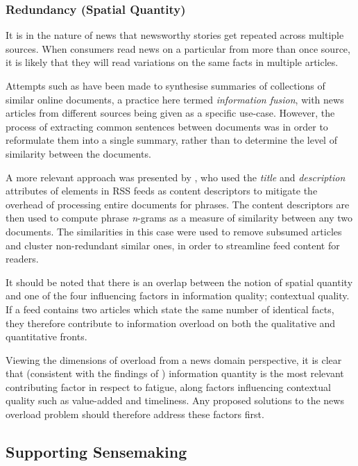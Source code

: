 \subsubsection{Redundancy (Spatial Quantity)}
It is in the nature of news that newsworthy stories get repeated across multiple sources. When consumers read news on a particular from more than once source, it is likely that they will read variations on the same facts in multiple articles.

Attempts such as \citep{InformationFusionInTheContextOfMultiDocumentSummarization} have been made to synthesise summaries of collections of similar online documents, a practice here termed \textit{information fusion}, with news articles from different sources being given as a specific use-case. However, the process of extracting common sentences between documents was in order to reformulate them into a single summary, rather than to determine the level of similarity between the documents.

A more relevant approach was presented by \cite{UtilizingPhraseSimilarityMeasures}, who used the \textit{title} and \textit{description} attributes of elements in RSS feeds as content descriptors to mitigate the overhead of processing entire documents for phrases. The content descriptors are then used to compute phrase \textit{n}-grams as a measure of similarity between any two documents. The similarities in this case were used to remove subsumed articles and cluster non-redundant similar ones, in order to streamline feed content for readers.

It should be noted that there is an overlap between the notion of spatial quantity and one of the four influencing factors in information quality; contextual quality. If a feed contains two articles which state the same number of identical facts, they therefore contribute to information overload on both the qualitative and quantitative fronts.

Viewing the dimensions of overload from a news domain perspective, it is clear that (consistent with the findings of \citet{TowardsAnOptimalResolutionToInformationOverload}) information quantity is the most relevant contributing factor in respect to fatigue, along factors influencing contextual quality such as value-added and timeliness. Any proposed solutions to the news overload problem should therefore address these factors first.

\subsection{Supporting Sensemaking}

